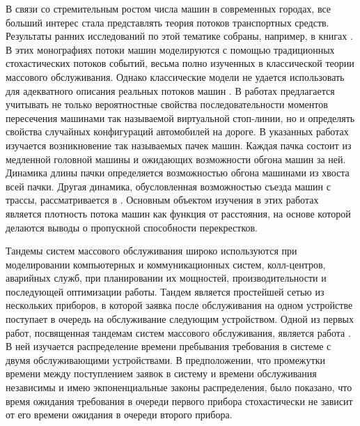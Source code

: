 \documentclass[a4paper,12pt,russian]{extarticle}
\begin{document}
В связи со стремительным ростом числа машин в современных городах, все больший интерес стала представлять теория потоков транспортных средств. Результаты ранних исследований по этой тематике собраны, например, в книгах \cite{Haight:1963, Drew:1968, Inose:1975}. В этих монографиях потоки машин моделируются с помощью традиционных стохастических потоков событий, весьма полно изученных в классической теории массового обслуживания. Однако классические модели не удается использовать для адекватного описания реальных потоков машин \cite{Bartlet:1963}. В работах
\cite{Fedotkin:2009,Fedotkin:Kudryavcev:Rachinskaya:2010, Rachinskaya:Fedotkin:2011:1,Rachinskaya:Fedotkin:2011:2, Fedotkin:Kudryavcev:Rachinskaya:2011, Rachinskaya:Fedotkin:2012, Rachinskaya:Fedotkin:2013, Rachinskaya:Fedotkin:2014} предлагается учитывать не только вероятностные свойства последовательности моментов пересечения машинами так называемой виртуальной стоп-линии, но и определять свойства случайных конфигураций автомобилей на дороге. В указанных работах изучается возникновение так называемых пачек машин. Каждая пачка состоит из медленной головной машины и ожидающих возможности обгона машин за ней. Динамика длины пачки определяется возможностью обгона машинами из хвоста всей пачки. Другая динамика, обусловленная возможностью съезда машин с трассы, рассматривается в \cite{Afanasyeva:Bulinskaya:2013:1,Afanasyeva:Bulinskaya:2010,Afanasyeva:Bulinskaya:2013:2}. Основным объектом изучения в этих работах является плотность потока машин как функция от расстояния, на основе которой делаются выводы о пропускной способности перекрестков.

Тандемы систем массового обслуживания широко используются при моделировании компьютерных и коммуникационных систем, колл-центров, аварийных служб, при планировании их мощностей, производительности и последующей оптимизации работы. 
Тандем является простейшей сетью из нескольких приборов, в которой заявка после обслуживания на одном устройстве  поступает в очередь на обслуживание следующим устройством.
Одной из первых работ, посвященная тандемам систем массового обслуживания, является работа \cite{Reich:1957}. В ней изучается распределение времени пребывания требования в системе с двумя обслуживающими устройствами. В предположении, что промежутки времени между поступлением заявок в систему и времени обслуживания независимы и имею экпоненциальные законы распределения, было показано, что время ожидания требования в очереди первого прибора стохастически не зависит от его времени ожидания в очереди второго прибора. 
\end{document}
